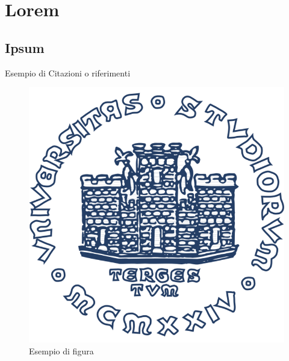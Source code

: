 \chapter{Lorem}\label{chap:lorem}

\section{Ipsum}

Esempio di Citazioni o riferimenti~\cite{einstein}\cite{latexcompanion}

\begin{figure}[h!]\label{fig:example}
\centering
\includegraphics[width=.8\textwidth]{img/units_logo.png}
\caption{Esempio di figura}
\end{figure}

\lipsum[3]

